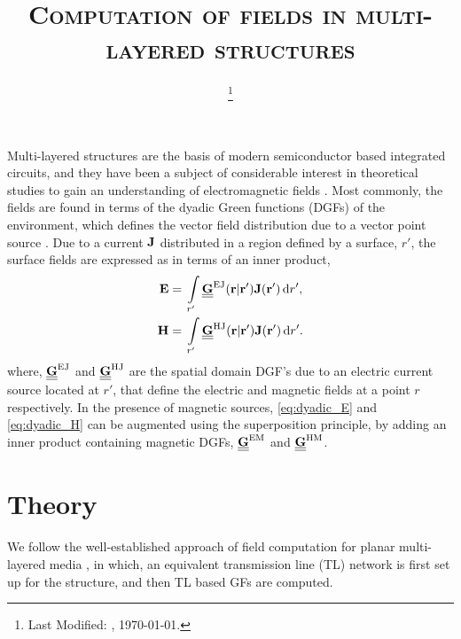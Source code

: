 \documentclass[12pt]{article}
\begin{document}
\title{\textsc{Computation of fields in multi-layered structures}}

\date{\footnote{Last Modified: \currenttime, \today.}}

\maketitle

Multi-layered structures are the basis of modern semiconductor based integrated circuits, and they have been a subject of considerable interest in theoretical studies to gain an understanding of electromagnetic fields \cite{somethinginhere}. Most commonly, the fields are found in terms of the dyadic Green functions (DGFs) of the environment, which defines the vector field distribution due to a vector point source \cite{van2007electromagnetic}. Due to a current $\mathbf{J}$ distributed in a region defined by a surface, $r'$, the surface fields are expressed as in terms of an inner product,
%
\begin{subequations}
  \begin{align}
    \mathbf{E} ={}& \int\limits_{r'} \underline{\underline{\mathbf{G}}}^\mathrm{EJ}(\mathbf{r} | \mathbf{r'}) \mathbf{J}(\mathbf{r'}) \mathop{}\!\mathrm{d}{r'},
    \label{eq:dyadic_E}\\
    \mathbf{H} ={}& \int\limits_{r'} \underline{\underline{\mathbf{G}}}^\mathrm{HJ}(\mathbf{r} | \mathbf{r'}) \mathbf{J}(\mathbf{r'}) \mathop{}\!\mathrm{d}{r'}.
    \label{eq:dyadic_H}
  \end{align}
  \label{eq:dyadic}%
\end{subequations}
where, $\underline{\underline{\mathbf{G}}}^\mathrm{EJ}$ and $\underline{\underline{\mathbf{G}}}^\mathrm{HJ}$ are the spatial domain DGF's due to an electric current source located at $r'$, that define the electric and magnetic fields at a point $r$ respectively. In the presence of magnetic sources, \eqref{eq:dyadic_E} and \eqref{eq:dyadic_H} can be augmented using the superposition principle, by adding an inner product containing magnetic DGFs, $\underline{\underline{\mathbf{G}}}^\mathrm{EM}$ and
$\underline{\underline{\mathbf{G}}}^\mathrm{HM}$.
\section{Theory}
%
We follow the well-established approach of field computation for planar multi-layered media \cite{Michalski2005,Michalski1997}, in which, an equivalent transmission line (TL) network is first set up for the structure, and then TL based GFs are computed.
\end{document}
